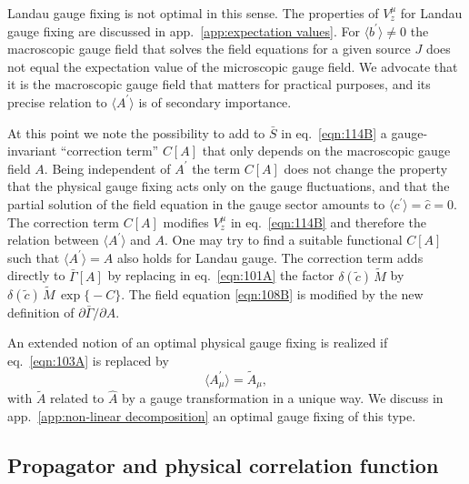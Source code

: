 \documentclass[twocolumn,aps,prd,amsmath,amssymb,preprintnumbers,longbibliography]{revtex4-1}
\numberwithin{equation}{section}
\begin{document}
Landau gauge fixing is not optimal in this sense. The properties of $V_z^\mu$ for Landau gauge fixing are discussed in app.~\ref{app:expectation values}. For $\langle b^\prime\rangle \neq 0$ the macroscopic gauge field that solves the field equations for a given source $J$ does not equal the expectation value of the microscopic gauge field. We advocate that it is the macroscopic gauge field that matters for practical purposes, and its precise relation to $\langle A^\prime\rangle$ is of secondary importance.

At this point we note the possibility to add to $\bar{S}$ in eq.~\eqref{eqn:114B} a gauge-invariant ``correction term'' $C[A]$ that only depends on the macroscopic gauge field $A$. Being independent of $A^\prime$ the term $C[A]$ does not change the property that the physical gauge fixing acts only on the gauge fluctuations, and that the partial solution of the field equation in the gauge sector amounts to $\langle c^\prime\rangle = \hat{c} = 0$. The correction term $C[A]$ modifies $V_z^\mu$ in eq.~\eqref{eqn:114B} and therefore the relation between $\langle A^\prime\rangle$ and $A$. One may try to find a suitable functional $C[A]$ such that $\langle A^\prime\rangle = A$ also holds for Landau gauge. The correction term adds directly to $\bar\Gamma[A]$ by replacing in eq.~\eqref{eqn:101A} the factor $\delta(\tilde{c}) \, \tilde{M}$ by $\delta(\tilde{c}) \, \tilde{M} \, \exp\bigl\{-C\bigr\}$. The field equation \eqref{eqn:108B} is modified by the new definition of $\partial \bar\Gamma/\partial A$.

An extended notion of an optimal physical gauge fixing is realized if eq.~\eqref{eqn:103A} is replaced by
\begin{equation}\label{eqn:122AA}
	\langle A_\mu^\prime\rangle
	= \tilde{A}_\mu,
\end{equation}
with $\tilde{A}$ related to $\hat{A}$ by a gauge transformation in a unique way. We discuss in app.~\ref{app:non-linear decomposition} an optimal gauge fixing of this type.


\subsection{Propagator and physical correlation function}
\end{document}
